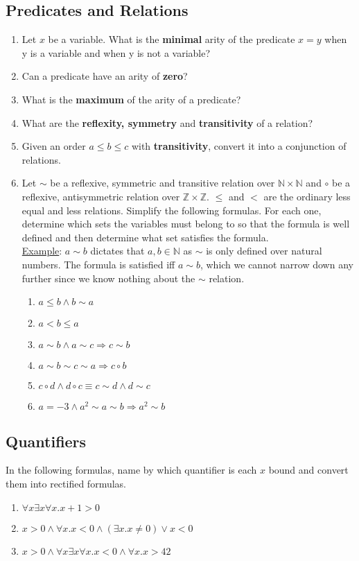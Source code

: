 \documentclass[12pt]{article}
\begin{document}
\subsection*{Predicates and Relations}
\begin{enumerate}
    \item Let $x$ be a variable. What is the \textbf{minimal} arity of the predicate $x = y$ when y is a variable and when 
    y is not a variable?
    \item Can a predicate have an arity of \textbf{zero}? 
    \item What is the \textbf{maximum} of the arity of a predicate?
    \item What are the \textbf{reflexity, symmetry} and \textbf{transitivity} of a relation?
    \item Given an order $a \leq b \leq c$ with \textbf{transitivity}, convert it into a conjunction of relations.
    \item Let $\sim$ be a reflexive, symmetric and transitive relation over $\mathbb{N} \times \mathbb{N}$ and 
    $\circ$ be a reflexive, antisymmetric relation over $\mathbb{Z} \times \mathbb{Z}$. $\leq$ and $<$ are the ordinary less equal and less relations.
    Simplify the following formulas. For each one, determine which sets the variables must belong to so that the formula is well defined and then determine what set satisfies the formula.
    \\
    \underline{Example}: $a \sim b$ dictates that $a, b \in \mathbb{N}$ as $\sim$ is only defined over natural numbers. The formula is satisfied iff $a \sim b$, which we cannot narrow down any further since we know nothing about the $\sim$ relation.
    \begin{enumerate}
        \item $a \leq b \land b \sim a$
        \item $a < b \leq a$
        \item $a \sim b \land a \sim c \Longrightarrow c \sim b$
        \item $a \sim b \sim c \sim a \Longrightarrow c \circ b$
        \item $c \circ d \land d \circ c \equiv c \sim d \land d \sim c$
        \item $a = -3 \land a^2 \sim a \sim b \Longrightarrow a^2 \sim b$
    \end{enumerate}
\end{enumerate}
\subsection*{Quantifiers}
In the following formulas, name by which quantifier is each $x$ bound and convert them into rectified formulas.
\begin{enumerate}
    \item $\forall x \exists x \forall x. x + 1 > 0$
    \item $x > 0 \land \forall x. x < 0 \land (\exists x. x \not=0) \lor x < 0$
    \item $x > 0 \land \forall x \exists x \forall x. x < 0 \land \forall x. x > 42$
\end{enumerate}
\end{document}
